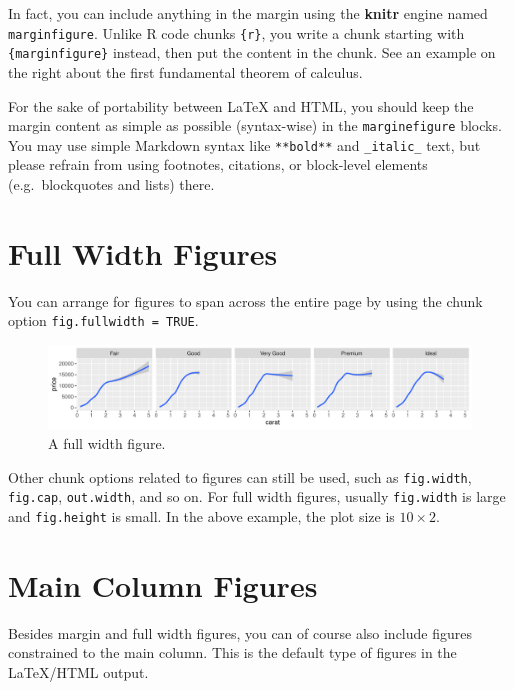 \documentclass[]{tufte-book}
\begin{document}
In fact, you can include anything in the margin using the \textbf{knitr}
engine named \texttt{marginfigure}. Unlike R code chunks
\texttt{\textasciigrave{}\textasciigrave{}\textasciigrave{}\{r\}}, you
write a chunk starting with
\texttt{\textasciigrave{}\textasciigrave{}\textasciigrave{}\{marginfigure\}}
instead, then put the content in the chunk. See an example on the right
about the first fundamental theorem of calculus.

For the sake of portability between LaTeX and HTML, you should keep the
margin content as simple as possible (syntax-wise) in the
\texttt{marginefigure} blocks. You may use simple Markdown syntax like
\texttt{**bold**} and \texttt{\_italic\_} text, but please refrain from
using footnotes, citations, or block-level elements (e.g.~blockquotes
and lists) there.

\hypertarget{full-width-figures}{%
\section{Full Width Figures}\label{full-width-figures}}

You can arrange for figures to span across the entire page by using the
chunk option \texttt{fig.fullwidth\ =\ TRUE}.

\begin{figure}
\includegraphics{FireScienceMethodsBook_files/figure-latex/fig-fullwidth-1} \caption[A full width figure]{A full width figure.}\label{fig:fig-fullwidth}
\end{figure}

Other chunk options related to figures can still be used, such as
\texttt{fig.width}, \texttt{fig.cap}, \texttt{out.width}, and so on. For
full width figures, usually \texttt{fig.width} is large and
\texttt{fig.height} is small. In the above example, the plot size is
\(10 \times 2\).

\hypertarget{main-column-figures}{%
\section{Main Column Figures}\label{main-column-figures}}

Besides margin and full width figures, you can of course also include
figures constrained to the main column. This is the default type of
figures in the LaTeX/HTML output.
\end{document}
